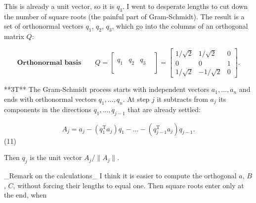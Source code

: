 This is already a unit vector, so it is \(q_{3}\). I went to desperate lengths to cut down the number of square roots (the painful part of Gram-Schmidt). The result is a set of orthonormal vectors \(q_{1}\), \(q_{2}\), \(q_{3}\), which go into the columns of an orthogonal matrix \(Q\):

\[\textbf{Orthonormal basis}\qquad Q=\begin{bmatrix}&&&\\ q_{1}&q_{2}&q_{3}\\ &&&\\ \end{bmatrix}=\begin{bmatrix}1/\sqrt{2}&1/\sqrt{2}&0\\ 0&0&1\\ 1/\sqrt{2}&-1/\sqrt{2}&0\end{bmatrix}.\]

**3T** The Gram-Schmidt process starts with independent vectors \(a_{1},\dots,a_{n}\) and ends with orthonormal vectors \(q_{1},\dots,q_{n}\). At step \(j\) it subtracts from \(a_{j}\) its components in the directions \(q_{1},\dots,q_{j-1}\) that are already settled:

\[A_{j}=a_{j}-(q_{1}^{\mathrm{T}}a_{j})q_{1}-\dots-(q_{j-1}^{\mathrm{T}}a_{j})q_ {j-1}.\] (11)

Then \(q_{j}\) is the unit vector \(A_{j}/\|A_{j}\|\).

_Remark on the calculations_ I think it is easier to compute the orthogonal \(a\), \(B\), \(C\), without forcing their lengths to equal one. Then square roots enter only at the end, when